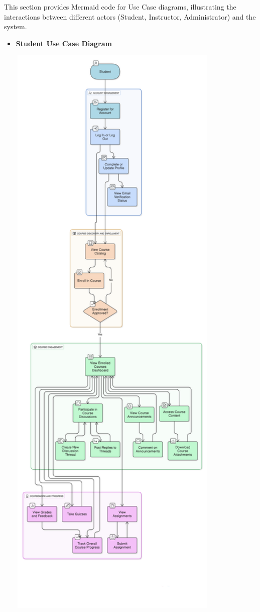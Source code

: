 \documentclass[12pt,a4paper]{article}
\begin{document}
This section provides Mermaid code for Use Case diagrams, illustrating the interactions between different actors (Student, Instructor, Administrator) and the system.

\begin{itemize}
    
    \item \textbf{Student Use Case Diagram}
    \begin{center}
        \includegraphics[width=0.8\textwidth,height=0.85\textheight,keepaspectratio]{student-usecase-diagram.png}

\end{center}
\end{itemize}
\end{document}
